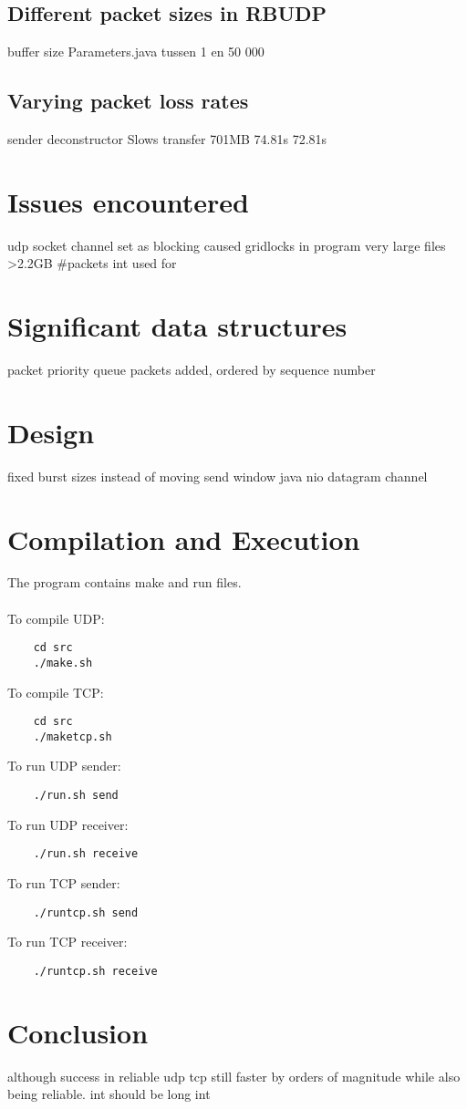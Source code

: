 \documentclass[a4paper,10pt]{article}
\begin{document}
\subsection{Different packet sizes in RBUDP}
buffer size Parameters.java tussen 1 en 50 000

\subsection{Varying packet loss rates}
sender deconstructor
Slows transfer 
701MB
74.81s
72.81s

\section{Issues encountered}
udp socket channel set as blocking caused gridlocks in program
very large files >2.2GB \#packets int used for %

\section{Significant data structures}
packet
priority queue packets added, ordered by sequence number

\section{Design}
fixed burst sizes instead of moving send window
java nio datagram channel

\section{Compilation and Execution}
The program contains make and run files.\\\\
To compile UDP:
\begin{verbatim}
	cd src
	./make.sh
\end{verbatim}
To compile TCP:
\begin{verbatim}
	cd src
	./maketcp.sh
\end{verbatim}
To run UDP sender:
\begin{verbatim}
	./run.sh send
\end{verbatim}
To run UDP receiver:
\begin{verbatim}
	./run.sh receive
\end{verbatim}
To run TCP sender:
\begin{verbatim}
	./runtcp.sh send
\end{verbatim}
To run TCP receiver:
\begin{verbatim}
	./runtcp.sh receive
\end{verbatim}

\section{Conclusion}
although success in reliable udp tcp still faster by orders of magnitude while also being reliable. 
int should be long int

\pagebreak


\end{document}
